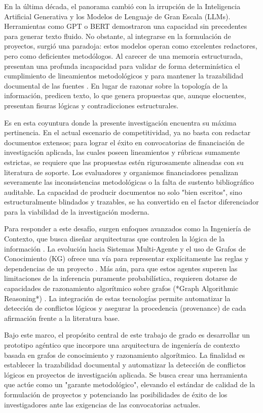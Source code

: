 \documentclass[12pt,letterpaper]{article}
\begin{document}
En la última década, el panorama cambió con la irrupción de la Inteligencia Artificial Generativa y los Modelos de Lenguaje de Gran Escala (LLMs). Herramientas como GPT o BERT demostraron una capacidad sin precedentes para generar texto fluido. No obstante, al integrarse en la formulación de proyectos, surgió una paradoja: estos modelos operan como excelentes redactores, pero como deficientes metodólogos. Al carecer de una memoria estructurada, presentan una profunda incapacidad para validar de forma determinística el cumplimiento de lineamientos metodológicos y para mantener la trazabilidad documental de las fuentes \citep{Gloaguen2025}. En lugar de razonar sobre la topología de la información, predicen texto, lo que genera propuestas que, aunque elocuentes, presentan fisuras lógicas y contradicciones estructurales.

Es en esta coyuntura donde la presente investigación encuentra su máxima pertinencia. En el actual escenario de competitividad, ya no basta con redactar documentos extensos; para lograr el éxito en convocatorias de financiación de investigación aplicada, las cuales poseen lineamientos y rúbricas sumamente estrictas, se requiere que las propuestas estén rigurosamente alineadas con su literatura de soporte. Los evaluadores y organismos financiadores penalizan severamente las inconsistencias metodológicas o la falta de sustento bibliográfico auditable. La capacidad de producir documentos no solo "bien escritos", sino estructuralmente blindados y trazables, se ha convertido en el factor diferenciador para la viabilidad de la investigación moderna.

Para responder a este desafío, surgen enfoques avanzados como la Ingeniería de Contexto, que busca diseñar arquitecturas que controlen la lógica de la información \citep{Zhuang2025}. La evolución hacia Sistemas Multi-Agente y el uso de Grafos de Conocimiento (KG) ofrece una vía para representar explícitamente las reglas y dependencias de un proyecto \citep{Ibrahim2024}. Más aún, para que estos agentes superen las limitaciones de la inferencia puramente probabilística, requieren dotarse de capacidades de razonamiento algorítmico sobre grafos (*Graph Algorithmic Reasoning*) \citep{Shi2025}. La integración de estas tecnologías permite automatizar la detección de conflictos lógicos y asegurar la procedencia (provenance) de cada afirmación frente a la literatura base.

Bajo este marco, el propósito central de este trabajo de grado es desarrollar un prototipo agéntico que incorpore una arquitectura de ingeniería de contexto basada en grafos de conocimiento y razonamiento algorítmico. La finalidad es establecer la trazabilidad documental y automatizar la detección de conflictos lógicos en proyectos de investigación aplicada. Se busca crear una herramienta que actúe como un "garante metodológico", elevando el estándar de calidad de la formulación de proyectos y potenciando las posibilidades de éxito de los investigadores ante las exigencias de las convocatorias actuales.
\end{document}
